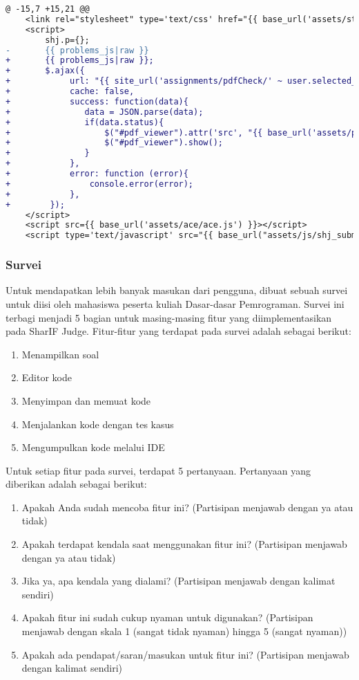 \begin{lstlisting}[language=diff, caption=Perubahan pada \texttt{submit.twig}, label=kode:5:viewpdf]
@ -15,7 +15,21 @@
	<link rel="stylesheet" type='text/css' href="{{ base_url('assets/styles/submit.css') }}"/>
	<script>
		shj.p={};
-		{{ problems_js|raw }}
+		{{ problems_js|raw }};
+		$.ajax({
+            url: "{{ site_url('assignments/pdfCheck/' ~ user.selected_assignment.id) }}", 
+            cache: false,
+            success: function(data){
+				data = JSON.parse(data);
+				if(data.status){
+					$("#pdf_viewer").attr('src', "{{ base_url('assets/pdfjs/web/viewer.html?file=') ~ site_url('assignments/pdf/' ~ user.selected_assignment.id ~ '/null/true') }}");
+					$("#pdf_viewer").show();
+				}
+            },
+            error: function (error){
+                console.error(error);
+            },
+        });
	</script>
	<script src={{ base_url('assets/ace/ace.js') }}></script>
	<script type='text/javascript' src="{{ base_url("assets/js/shj_submit.js") }}"></script>
\end{lstlisting}

\subsubsection{Survei}
Untuk mendapatkan lebih banyak masukan dari pengguna, dibuat sebuah survei untuk diisi oleh mahasiswa peserta kuliah Dasar-dasar Pemrograman. Survei ini terbagi menjadi 5 bagian untuk masing-masing fitur yang diimplementasikan pada SharIF Judge. Fitur-fitur yang terdapat pada survei adalah sebagai berikut:

\begin{enumerate}
    \item Menampilkan soal
    \item Editor kode
    \item Menyimpan dan memuat kode
    \item Menjalankan kode dengan tes kasus
    \item Mengumpulkan kode melalui IDE
\end{enumerate}

Untuk setiap fitur pada survei, terdapat 5 pertanyaan. Pertanyaan yang diberikan adalah sebagai berikut:

\begin{enumerate}
    \item Apakah Anda sudah mencoba fitur ini? (Partisipan menjawab dengan ya atau tidak)
    \item Apakah terdapat kendala saat menggunakan fitur ini? (Partisipan menjawab dengan ya atau tidak)
    \item Jika ya, apa kendala yang dialami? (Partisipan menjawab dengan kalimat sendiri)
    \item Apakah fitur ini sudah cukup nyaman untuk digunakan? (Partisipan menjawab dengan skala 1 (sangat tidak nyaman) hingga 5 (sangat nyaman))
    \item Apakah ada pendapat/saran/masukan untuk fitur ini? (Partisipan menjawab dengan kalimat sendiri)
\end{enumerate}

